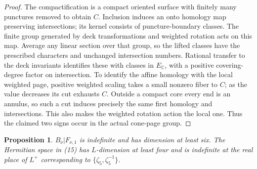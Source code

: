 \documentclass[11pt]{article}
\newtheorem{proposition}[theorem]{Proposition}
\newcommand{\C}{\mathbb C}
\begin{document}
\begin{proof}
The compactification is a compact oriented surface with finitely
many punctures removed to obtain \(C\).
Inclusion induces an onto homology map preserving intersections;
its kernel consists of puncture-boundary classes.
The finite group generated by deck transformations and weighted
rotation acts on this map. Average any linear section over that
group, so the lifted classes have the prescribed characters and
unchanged intersection numbers. Rational transfer to the deck
invariants identifies these with classes in \(E_\C\), with a
positive covering-degree factor on intersection.
To identify the affine homology with the local weighted page,
positive weighted scaling takes a small nonzero fiber to \(C\);
as the value decreases its cut exhausts \(C\).
Outside a compact core every end is an annulus, so such a cut
induces precisely the same first homology and intersections.
This also makes the weighted rotation action the local one.
Thus the claimed two signs occur in the actual cone-page group.
\end{proof}

\begin{proposition}\label{prop:real}
\(B_\nu|F_{\nu,1}\) is indefinite and has dimension at least six.
The Hermitian space in (15) has \(L\)-dimension at least four
and is indefinite at the real place of \(L^+\) corresponding to
\(\{\zeta_5,\zeta_5^{-1}\}\).
\end{proposition}
\end{document}
